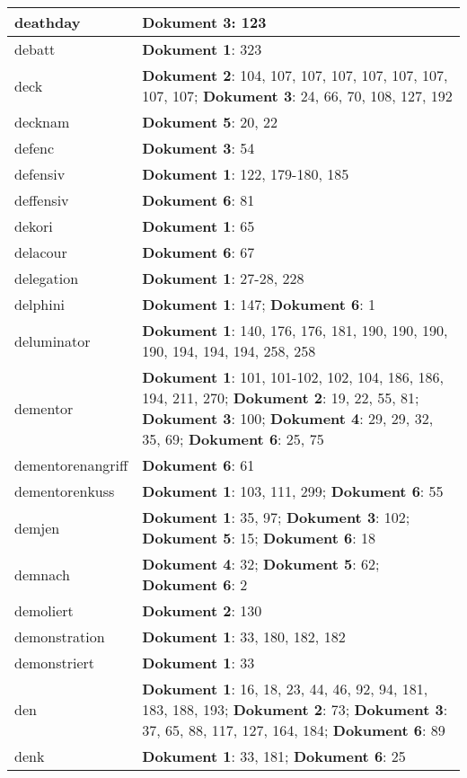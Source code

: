 \documentclass[a5paper]{article}
\begin{document}
\begin{longtable}[l]{|l|p{3in}|}
\hline
deathday & \textbf{Dokument 3}: 123 \\
\hline
debatt & \textbf{Dokument 1}: 323 \\
\hline
deck & \textbf{Dokument 2}: 104, 107, 107, 107, 107, 107, 107, 107, 107; \textbf{Dokument 3}: 24, 66, 70, 108, 127, 192 \\
\hline
decknam & \textbf{Dokument 5}: 20, 22 \\
\hline
defenc & \textbf{Dokument 3}: 54 \\
\hline
defensiv & \textbf{Dokument 1}: 122, 179-180, 185 \\
\hline
deffensiv & \textbf{Dokument 6}: 81 \\
\hline
dekori & \textbf{Dokument 1}: 65 \\
\hline
delacour & \textbf{Dokument 6}: 67 \\
\hline
delegation & \textbf{Dokument 1}: 27-28, 228 \\
\hline
delphini & \textbf{Dokument 1}: 147; \textbf{Dokument 6}: 1 \\
\hline
deluminator & \textbf{Dokument 1}: 140, 176, 176, 181, 190, 190, 190, 190, 194, 194, 194, 258, 258 \\
\hline
dementor & \textbf{Dokument 1}: 101, 101-102, 102, 104, 186, 186, 194, 211, 270; \textbf{Dokument 2}: 19, 22, 55, 81; \textbf{Dokument 3}: 100; \textbf{Dokument 4}: 29, 29, 32, 35, 69; \textbf{Dokument 6}: 25, 75 \\
\hline
dementorenangriff & \textbf{Dokument 6}: 61 \\
\hline
dementorenkuss & \textbf{Dokument 1}: 103, 111, 299; \textbf{Dokument 6}: 55 \\
\hline
demjen & \textbf{Dokument 1}: 35, 97; \textbf{Dokument 3}: 102; \textbf{Dokument 5}: 15; \textbf{Dokument 6}: 18 \\
\hline
demnach & \textbf{Dokument 4}: 32; \textbf{Dokument 5}: 62; \textbf{Dokument 6}: 2 \\
\hline
demoliert & \textbf{Dokument 2}: 130 \\
\hline
demonstration & \textbf{Dokument 1}: 33, 180, 182, 182 \\
\hline
demonstriert & \textbf{Dokument 1}: 33 \\
\hline
den & \textbf{Dokument 1}: 16, 18, 23, 44, 46, 92, 94, 181, 183, 188, 193; \textbf{Dokument 2}: 73; \textbf{Dokument 3}: 37, 65, 88, 117, 127, 164, 184; \textbf{Dokument 6}: 89 \\
\hline
denk & \textbf{Dokument 1}: 33, 181; \textbf{Dokument 6}: 25 \\

\end{longtable}
\end{document}
